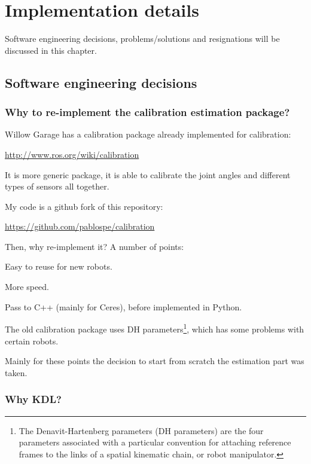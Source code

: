 \chapter{Implementation details}
\label{cha:implementation}

Software engineering decisions, problems/solutions and resignations will be discussed in this chapter.

\section{Software engineering decisions}

\subsection{Why to re-implement the calibration estimation package?}

Willow Garage has a calibration package already implemented for calibration:

\url{http://www.ros.org/wiki/calibration}

\noindent
It is more generic package, it is able to calibrate the joint angles and different types of sensors all together.


\noindent
My code is a github fork of this repository:

\url{https://github.com/pablospe/calibration}

\noindent
Then, why re-implement it? A number of points: %
\begin{itemize*}
 \item Easy to reuse for new robots.
 \item More speed.
 \item Pass to C++ (mainly for Ceres), before implemented in Python.
 \item The old calibration package uses DH parameters\footnote{The Denavit-Hartenberg parameters (DH parameters) are the four parameters associated with a particular convention for attaching reference frames to the links of a spatial kinematic chain, or robot manipulator.}, which has some problems with certain robots.
\end{itemize*}

Mainly for these points the decision to start from scratch the estimation part was taken.



\subsection{Why KDL?}

